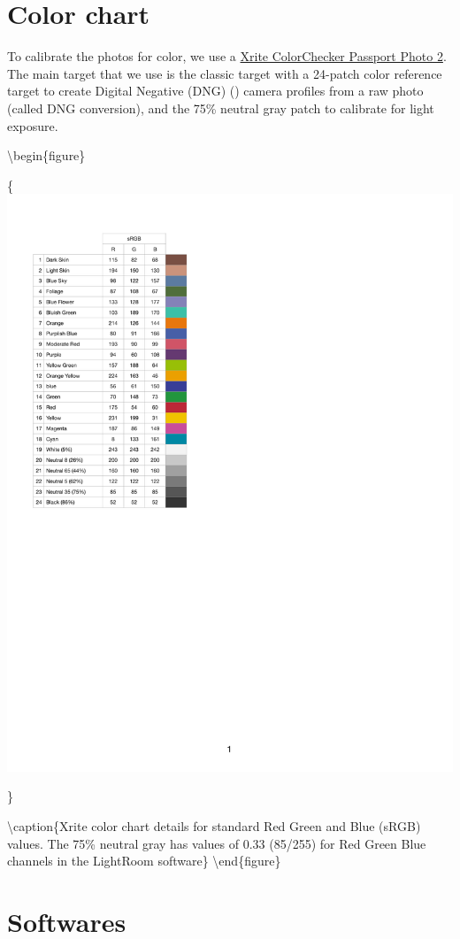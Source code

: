 \documentclass[
]{book}
\begin{document}
\hypertarget{color-chart}{%
\section{Color chart}\label{color-chart}}

To calibrate the photos for color, we use a \href{https://www.xrite.com/categories/calibration-profiling/colorchecker-classic-family/colorchecker-passport-photo-2}{Xrite ColorChecker Passport
Photo
2}.
The main target that we use is the classic target with a 24-patch color
reference target to create Digital Negative (DNG) (\citet{Adobe2012DNG}) camera
profiles from a raw photo (called DNG conversion), and the 75\% neutral
gray patch to calibrate for light exposure.

\textbackslash begin\{figure\}

\{\centering \includegraphics[width=0.5\linewidth]{Figures/Color_chart_sRGB_values}

\}

\textbackslash caption\{Xrite color chart details for standard Red Green and Blue (sRGB) values. The 75\% neutral gray has values of 0.33 (85/255) for Red Green Blue channels in the LightRoom software\}\label{fig:xrite}
\textbackslash end\{figure\}

\hypertarget{softwares}{%
\section{Softwares}\label{softwares}}
\end{document}
